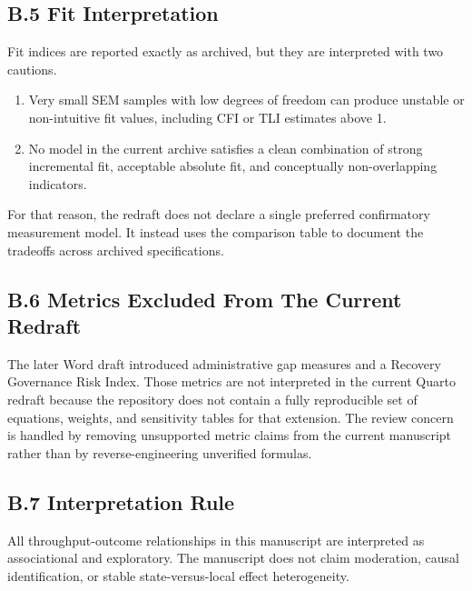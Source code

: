 \documentclass[
  letterpaper,
]{article}
\providecommand{\tightlist}{%
  \setlength{\itemsep}{0pt}\setlength{\parskip}{0pt}}
\begin{document}
\subsection{B.5 Fit Interpretation}\label{b.5-fit-interpretation}

Fit indices are reported exactly as archived, but they are interpreted
with two cautions.

\begin{enumerate}
\def\labelenumi{\arabic{enumi}.}
\tightlist
\item
  Very small SEM samples with low degrees of freedom can produce
  unstable or non-intuitive fit values, including CFI or TLI estimates
  above 1.
\item
  No model in the current archive satisfies a clean combination of
  strong incremental fit, acceptable absolute fit, and conceptually
  non-overlapping indicators.
\end{enumerate}

For that reason, the redraft does not declare a single preferred
confirmatory measurement model. It instead uses the comparison table to
document the tradeoffs across archived specifications.

\subsection{B.6 Metrics Excluded From The Current
Redraft}\label{b.6-metrics-excluded-from-the-current-redraft}

The later Word draft introduced administrative gap measures and a
Recovery Governance Risk Index. Those metrics are not interpreted in the
current Quarto redraft because the repository does not contain a fully
reproducible set of equations, weights, and sensitivity tables for that
extension. The review concern is handled by removing unsupported metric
claims from the current manuscript rather than by reverse-engineering
unverified formulas.

\subsection{B.7 Interpretation Rule}\label{b.7-interpretation-rule}

All throughput-outcome relationships in this manuscript are interpreted
as associational and exploratory. The manuscript does not claim
moderation, causal identification, or stable state-versus-local effect
heterogeneity.

\newpage
\end{document}
